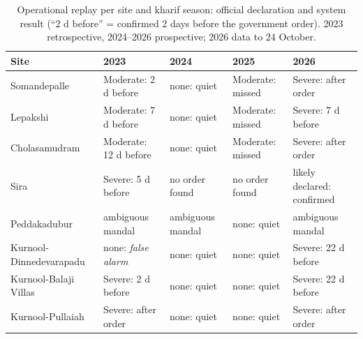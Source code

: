 \begin{table}[H]
\centering
\caption{Operational replay per site and kharif season: official declaration and system result (``2 d before'' = confirmed 2 days before the government order). 2023 retrospective, 2024--2026 prospective; 2026 data to 24 October.}
\label{tab:s_replay_sites}
\footnotesize
\begin{tabular}{@{}lllll@{}}
\toprule
\textbf{Site} & \textbf{2023} & \textbf{2024} & \textbf{2025} & \textbf{2026} \\
\midrule
Somandepalle & Moderate: 2 d before & none: quiet & Moderate: missed & Severe: after order \\
Lepakshi & Moderate: 7 d before & none: quiet & Moderate: missed & Severe: 7 d before \\
Cholasamudram & Moderate: 12 d before & none: quiet & Moderate: missed & Severe: after order \\
Sira & Severe: 5 d before & no order found & no order found & likely declared: confirmed \\
Peddakadubur & ambiguous mandal & ambiguous mandal & none: quiet & ambiguous mandal \\
Kurnool-Dinnedevarapadu & none: \textit{false alarm} & none: quiet & none: quiet & Severe: 22 d before \\
Kurnool-Balaji Villas & Severe: 2 d before & none: quiet & none: quiet & Severe: 22 d before \\
Kurnool-Pullaiah & Severe: after order & none: quiet & none: quiet & Severe: after order \\
\bottomrule
\end{tabular}
\end{table}
